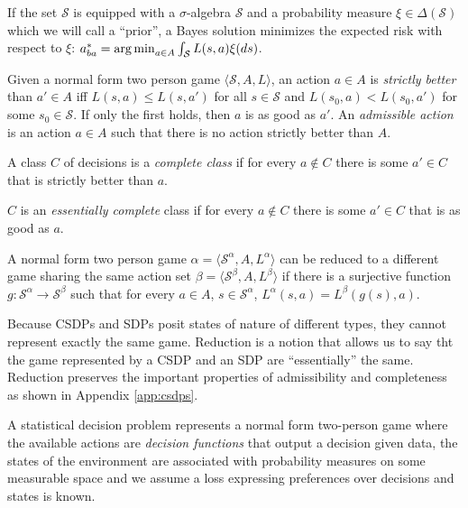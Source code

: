 If the set $\mathscr{S}$ is equipped with a $\sigma$-algebra $\mathcal{S}$ and a probability measure $\xi\in \Delta(\mathcal{S})$ which we will call a ``prior'', a Bayes solution minimizes the expected risk with respect to $\xi$: $a^*_{ba} = \operatorname*{arg\,min}_{a\in A} \int_{\mathcal{S}} L(s,a) \xi(ds)$.

\begin{definition}
Given a normal form two person game $\langle \mathscr{S}, A, L\rangle$, an action $a\in A$ is \emph{strictly better} than $a'\in A$ iff $L(s,a)\leq L(s,a')$ for all $s\in\mathscr{S}$ and $L(s_0,a)<L(s_0,a')$ for some $s_0\in \mathscr{S}$. If only the first holds, then $a$ is as good as $a'$. An \emph{admissible action} is an action $a\in A$ such that there is no action strictly better than $A$.
\end{definition}

\begin{definition}
A class $C$ of decisions is a \emph{complete class} if for every $a\not\in C$ there is some $a'\in C$ that is strictly better than $a$.

$C$ is an \emph{essentially complete} class if for every $a\not\in C$ there is some $a'\in C$ that is as good as $a$.
\end{definition}

\begin{definition}[Reduction]\label{def:red_sdp_CSDP}
A normal form two person game $\alpha = \langle \mathscr{S}^\alpha, A, L^\alpha\rangle$ can be reduced to a different game sharing the same action set $\beta = \langle \mathscr{S}^\beta, A, L^\beta \rangle$ if there is a surjective function $g:\mathscr{S}^\alpha\to \mathscr{S}^\beta$ such that for every $a\in A$, $s\in \mathscr{S}^\alpha$, $L^\alpha(s,a) = L^\beta(g(s),a)$.
\end{definition}

Because CSDPs and SDPs posit states of nature of different types, they cannot represent exactly the same game. Reduction is a notion that allows us to say tht the game represented by a CSDP and an SDP are ``essentially'' the same. Reduction preserves the important properties of admissibility and completeness as shown in Appendix \ref{app:csdps}.

A statistical decision problem represents a normal form two-person game where the available actions are \emph{decision functions} that output a decision given data, the states of the environment are associated with probability measures on some measurable space and we assume a loss expressing preferences over decisions and states is known.

